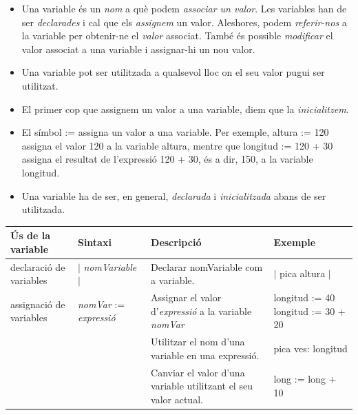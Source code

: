 \begin{itemize}
\item Una variable és un \emph{nom} a què podem \emph{associar un valor}. Les variables han de ser \emph{declarades} i cal que els \emph{assignem} un valor. Aleshores, podem \emph{referir-nos} a la variable per obtenir-ne el \emph{valor} associat. També és possible \emph{modificar} el valor associat a una variable i assignar-hi un nou valor. 
\item Una variable pot ser utilitzada a qualsevol lloc on el seu valor pugui ser utilitzat.
\item El primer cop que assignem un valor a una variable, diem que la \emph{inicialitzem}.
\item El símbol \textsf{:=} assigna un valor a una variable. Per exemple, \textsf{altura := 120} assigna el valor \textsf{120} a la variable \textsf{altura}, mentre que \textsf{longitud := 120 + 30} assigna el resultat de l'expressió \textsf{120 + 30}, és a dir, \textsf{150}, a la variable \textsf{longitud}.
\item Una variable ha de ser, en general, \emph{declarada} i \emph{inicialitzada} abans de ser utilitzada.
\end{itemize}

\vspace*{5mm}
\noindent
\setlength{\extrarowheight}{1mm}
{\small \begin{tabular}{p{30mm}p{30mm}p{40mm}p{30mm}}
\hline
\textbf{Ús de la variable} & \textbf{Sintaxi} & \textbf{Descripció} & \textbf{Exemple}\\
\hline
declaració de \newline variables & \textsf{$|$ {\itshape nomVariable} $|$} &
Declarar \textsf{nomVariable} com a variable.
& \textsf{$|$ pica altura $|$}\\
assignació de \newline variables & \textsf{{\itshape nomVar} := {\itshape expressió}} &
Assignar el valor d'\textsf{{\itshape expressió}} a la variable \textsf{{\itshape nomVar}}
& \textsf{longitud := 40  \newline  longitud := 30 + 20}\\ 
&  &
Utilitzar el nom d'una variable en una expressió.
& \textsf{pica ves: longitud}\\ 
&  &
Canviar el valor d'una variable utilitzant el seu valor actual.
& \textsf{long := long + 10}\\ 
\hline
\end{tabular}}

